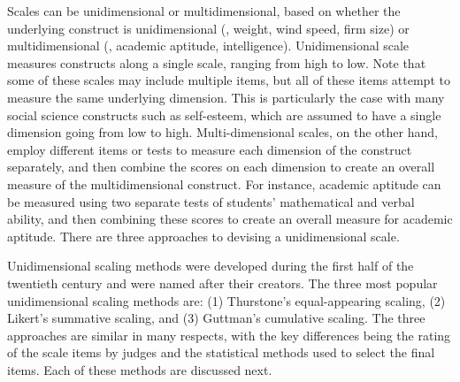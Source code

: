 Scales can be unidimensional or multidimensional, based on whether the underlying construct is unidimensional (\eg, weight, wind speed, firm size) or multidimensional (\eg, academic aptitude, intelligence). Unidimensional scale measures constructs along a single scale, ranging from high to low. Note that some of these scales may include multiple items, but all of these items attempt to measure the same underlying dimension. This is particularly the case with many social science constructs such as self-esteem, which are assumed to have a single dimension going from low to high. Multi-dimensional scales, on the other hand, employ different items or tests to measure each dimension of the construct separately, and then combine the scores on each dimension to create an overall measure of the multidimensional construct. For instance, academic aptitude can be measured using two separate tests of students' mathematical and verbal ability, and then combining these scores to create an overall measure for academic aptitude. There are three approaches to devising a unidimensional scale.

Unidimensional scaling methods were developed during the first half of the twentieth century and were named after their creators. The three most popular unidimensional scaling methods are: (1) Thurstone's equal-appearing scaling, (2) Likert's summative scaling, and (3) Guttman's cumulative scaling. The three approaches are similar in many respects, with the key differences being the rating of the scale items by judges and the statistical methods used to select the final items. Each of these methods are discussed next.

